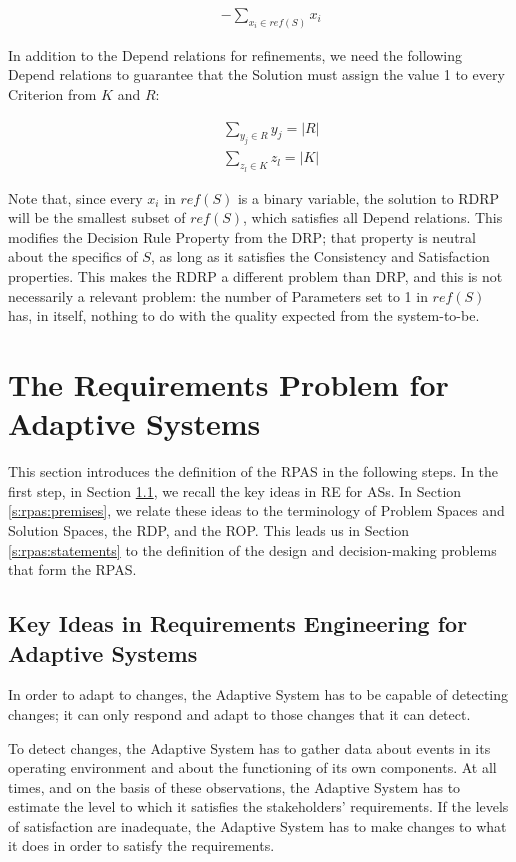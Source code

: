 \documentclass[graybox]{svmult}
\newcommand{\zi}[1]{\textit{#1}}
\newcommand{\xf}[1]{\textsf{#1}}
\newcommand{\REfull}{Requirements Engineering}
\newcommand{\RE}{RE}
\newcommand{\RPfull}{Requirements Problem}
\newcommand{\ASfull}{Adaptive System}
\newcommand{\AS}{AS}
\newcommand{\RPASfull}{\RPfull{} for \ASfull}
\newcommand{\RPAS}{RPAS}
\newcommand{\ZJRP}{DRP}
\newcommand{\SolutionSpace}{Solution Space}
\newcommand{\ProblemSpace}{Problem Space}
\newcommand{\Solution}{Solution}
\newcommand{\Criterion}{Criterion}
\newcommand{\Parameter}{Parameter}
\newcommand{\Depend}{Depend}
\newcommand{\ROP}{ROP}
\newcommand{\RDP}{RDP}
\newcommand{\ZJROP}{RDRP}
\newcommand{\PrSatisfaction}{\xf{Satisfaction}}
\newcommand{\PrConsistency}{\xf{Consistency}}
\newcommand{\PrDR}{\xf{Decision Rule}}
\newcommand{\PropDR}{\PrDR{} Property}
\begin{document}
\begin{eqnarray*}
    & & -\sum_{x_{i} \in \zi{ref}(S)}x_{i}
\end{eqnarray*}

In addition to the \Depend{} relations for refinements, we need the following \Depend{} relations to guarantee that the \Solution{} must assign the value 1 to every \Criterion{} from $K$ and $R$:

\begin{eqnarray*}
    & & \sum_{y_{j} \in R}y_{j} = |R| \\
    & & \sum_{z_{l} \in K}z_{l} = |K|
\end{eqnarray*}

Note that, since every $x_{i}$ in $\zi{ref}(S)$ is a binary variable, the solution to \ZJROP{} will be the smallest subset of $\zi{ref}(S)$, which satisfies all \Depend{} relations. This modifies the \PropDR{} from the \ZJRP; that property is neutral about the specifics of $S$, as long as it satisfies the \PrConsistency{} and \PrSatisfaction{} properties. This makes the \ZJROP{} a different problem than \ZJRP, and this is not necessarily a relevant problem: the number of \Parameter s set to 1 in $\zi{ref}(S)$ has, in itself, nothing to do with the quality expected from the system-to-be. 


%
\section{The \RPASfull s}\label{s:rpas}
This section introduces the definition of the \RPAS{} in the following steps. In the first step, in Section \ref{s:rpas:key-ideas}, we recall the key ideas in \RE{} for \AS s. In Section \ref{s:rpas:premises}, we relate these ideas to the terminology of \ProblemSpace s and \SolutionSpace s, the \RDP, and the \ROP. This leads us in Section \ref{s:rpas:statements} to the definition of the design and decision-making problems that form the \RPAS.


%
\subsection{Key Ideas in \REfull{} for \ASfull s}\label{s:rpas:key-ideas}
In order to adapt to changes, the \ASfull{} has to be capable of detecting changes; it can only respond and adapt to those changes that it can detect.

To detect changes, the \ASfull{} has to gather data about events in its operating environment and about the functioning of its own components. At all times, and on the basis of these observations, the \ASfull{} has to estimate the level to which it satisfies the stakeholders' requirements. If the levels of satisfaction are inadequate, the \ASfull{} has to make changes to what it does in order to satisfy the requirements. 
\end{document}
